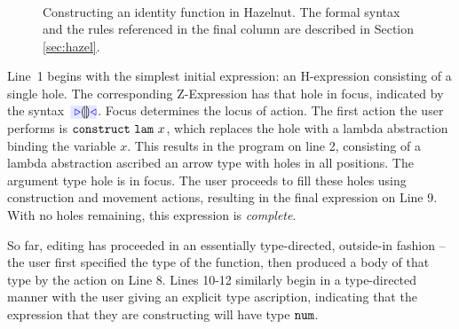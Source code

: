 \begin{figure}[t!]
\[\begin{array}{|c||c|c||l|l|}
\end{array}
\]
\caption{Constructing an identity function in Hazelnut. The formal syntax and the rules referenced in the final column are described in Section \ref{sec:hazel}.}
\label{fig:first-example}
\end{figure}

Line~1 begins with the simplest initial expression: an H-expression
consisting of a single hole. The corresponding Z-Expression has that hole in focus,
indicated by the syntax~$\zwsel{\hehole}$. Focus determines the locus of action. The first action the user performs is $\mathtt{construct}~\mathtt{lam}~x$, which replaces the hole with a lambda abstraction binding the variable $x$. This results in the program on line
2, consisting of a lambda abstraction ascribed an arrow type with holes in all positions. The argument type hole is in focus. The
user proceeds to fill these holes using construction and movement actions, resulting in the final expression on Line 9. With no holes remaining, this expression is \emph{complete}.%

So far, editing has proceeded in an essentially type-directed, outside-in fashion -- the user first specified the type of the function, then produced a body of that type by the action on Line 8. Lines 10-12 similarly begin in a type-directed manner with the user giving an explicit type ascription, indicating that the expression that they are constructing will have type $\texttt{num}$. 

